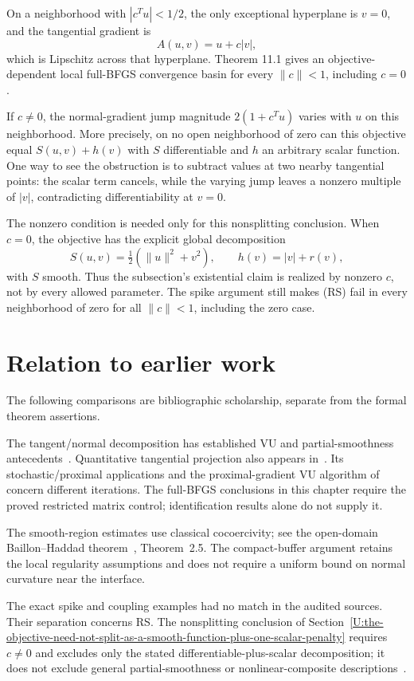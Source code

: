 On a neighborhood with \(|c^Tu|<1/2\), the only exceptional hyperplane
is \(v=0\), and the tangential gradient is \[
 A(u,v)=u+c|v|,
\] which is Lipschitz across that hyperplane. Theorem 11.1 gives an objective-dependent local full-BFGS convergence basin for every $\|c\|<1$, including $c=0$.

If $c\ne0$, the normal-gradient jump magnitude $2(1+c^Tu)$ varies with $u$ on this neighborhood. More precisely, on no open neighborhood of zero can this objective equal $S(u,v)+h(v)$ with $S$ differentiable and $h$ an arbitrary scalar function. One way to see the obstruction is to subtract values at two nearby tangential points: the scalar term cancels, while the varying jump leaves a nonzero multiple of $|v|$, contradicting differentiability at $v=0$.

The nonzero condition is needed only for this nonsplitting conclusion. When $c=0$, the objective has the explicit global decomposition
\[
 S(u,v)=\tfrac12(\|u\|^2+v^2),\qquad h(v)=|v|+r(v),
\]
with $S$ smooth. Thus the subsection's existential claim is realized by nonzero $c$, not by every allowed parameter. The spike argument still makes (RS) fail in every neighborhood of zero for all $\|c\|<1$, including the zero case.


\endgroup


\section*{Relation to earlier work}
The following comparisons are bibliographic scholarship, separate from the formal theorem assertions.

The tangent/normal decomposition has established VU and partial-smoothness antecedents~\cite{geom_Lewis2002,LL}. Quantitative tangential projection also appears in~\cite{geom_DDJ2026}. Its stochastic/proximal applications and the proximal-gradient VU algorithm of~\cite{geom_LSS2025} concern different iterations. The full-BFGS conclusions in this chapter require the proved restricted matrix control; identification results alone do not supply it.

The smooth-region estimates use classical cocoercivity; see the open-domain Baillon--Haddad theorem~\cite{WW}, Theorem~2.5. The compact-buffer argument retains the local regularity assumptions and does not require a uniform bound on normal curvature near the interface.

The exact spike and coupling examples had no match in the audited sources. Their separation concerns RS. The nonsplitting conclusion of Section~\ref{U:the-objective-need-not-split-as-a-smooth-function-plus-one-scalar-penalty} requires $c\ne0$ and excludes only the stated differentiable-plus-scalar decomposition; it does not exclude general partial-smoothness or nonlinear-composite descriptions~\cite{geom_Lewis2002,LL}.
